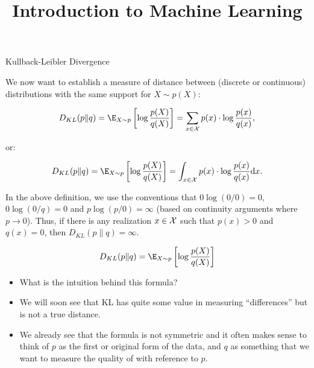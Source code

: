\documentclass[11pt,compress,t,notes=noshow, xcolor=table]{beamer}
\title{Introduction to Machine Learning}
\begin{document}
    

\begin{vbframe} {Kullback-Leibler Divergence}

We now want to establish a measure of distance between (discrete or continuous) distributions with the same support for $X \sim p(X)$:

  $$ D_{KL}(p \| q) = \E_{X \sim p} \left[\log \frac{p(X)}{q(X)}\right] = \sum_{x \in \Xspace} p(x) \cdot \log \frac{p(x)}{q(x)}, $$
  
  or: 
  
  $$ D_{KL}(p \| q) = \E_{X \sim p} \left[\log \frac{p(X)}{q(X)}\right] = \int_{x \in \Xspace} p(x) \cdot \log \frac{p(x)}{q(x)} \mathrm{d}x. $$

In the above definition, we use the conventions that $0 \log (0/0) = 0$, $0 \log (0/q) = 0$ and $p \log(p/0) = \infty$ (based on continuity arguments where $p \to 0$). 
Thus, if there is any realization $x \in \mathcal{X}$ such that $p(x) > 0$ and $q(x) = 0$,
then $D_{KL}(p \| q) = \infty.$
  
\framebreak

$$ D_{KL}(p \| q) = \E_{X \sim p} \left[\log \frac{p(X)}{q(X)}\right] $$

\begin{itemize}
  \item  What is the intuition behind this formula?  
  \item  We will soon see that KL has quite some value in measuring \enquote{differences} but is not a true distance. 
  \item  We already see that the formula is not symmetric and it often makes sense to think of $p$ as the first or original form of the data,
    and $q$ as something that we want to measure the quality of with reference to $p$.
  \end{itemize}

\end{vbframe}
\end{document}
